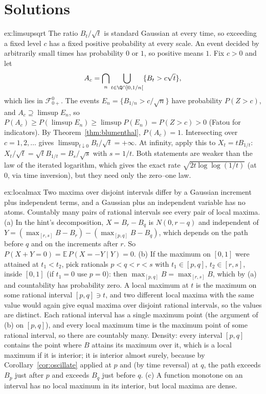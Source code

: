 \section{Solutions}

\begin{solution}{ex:limsupsqrt}
\idea The ratio $B_t/\sqrt t$ is standard Gaussian at every time, so exceeding a fixed level $c$ has a fixed positive probability at every scale. An event decided by arbitrarily small times has
probability $0$ or $1$, so positive means $1$.
\writeup Fix $c>0$ and let
\[A_c=\bigcap_n\bigcup_{t\in\Q\cap]0,1/n[}\{B_t>c\sqrt t\},\]
which lies in $\mathcal F^0_{0+}$. The events $E_n=\{B_{1/n}>c/\sqrt n\}$ have probability $P(Z>c)$, and
$A_c\supseteq\limsup E_n$, so $P(A_c)\ge P(\limsup E_n)\ge\limsup P(E_n)=P(Z>c)>0$ (Fatou for indicators). By Theorem~\ref{thm:blumenthal}, $P(A_c)=1$. Intersecting over $c=1,2,\dots$ gives
$\limsup_{t\downarrow0}B_t/\sqrt t=+\infty$. At infinity, apply this to $X_t=tB_{1/t}$: $X_t/\sqrt t=\sqrt tB_{1/t}=B_s/\sqrt s$ with $s=1/t$. Both statements are weaker than the law of the iterated logarithm, which gives the
exact rate $\sqrt{2t\log\log(1/t)}$ (at $0$, via time inversion), but they need only the zero--one law.
\end{solution}

\begin{solution}{ex:localmax}
\idea Two maxima over disjoint intervals differ by a Gaussian increment plus independent terms, and a Gaussian plus an independent variable has no atoms. Countably many pairs of rational intervals see every pair
of local maxima.
\writeup (a) In the hint's decomposition, $X=B_r-B_q$ is $N(0,r-q)$ and independent of $Y=(\max_{[r,s]}B-B_r)-(\max_{[p,q]}B-B_q)$, which depends on the path before $q$ and on the increments after $r$. So
$P(X+Y=0)=\mathbb E\,P(X=-Y\mid Y)=0$. (b) If the maximum on $[0,1]$ were attained at $t_1<t_2$, pick rationals $p<q<r<s$ with $t_1\in[p,q]$, $t_2\in[r,s]$, inside $[0,1]$ (if $t_1=0$ use $p=0$): then
$\max_{[p,q]}B=\max_{[r,s]}B$, which by (a) and countability has probability zero. A local maximum at $t$ is the maximum on some rational interval $[p,q]\ni t$, and two different local maxima with the same value would
again give equal maxima over disjoint rational intervals, so the values are distinct. Each rational interval has a single maximum point (the argument of (b) on $[p,q]$), and every local maximum time is the maximum
point of some rational interval, so there are countably many. Density: every interval $[p,q]$ contains the point where $B$ attains its maximum over it, which is a local maximum if it is interior; it is interior
almost surely, because by Corollary~\ref{cor:oscillate} applied at $p$ and (by time reversal) at $q$, the path exceeds $B_p$ just after $p$ and exceeds $B_q$ just before $q$. (c) A function monotone on an interval has no local
maximum in its interior, but local maxima are dense.
\end{solution}

